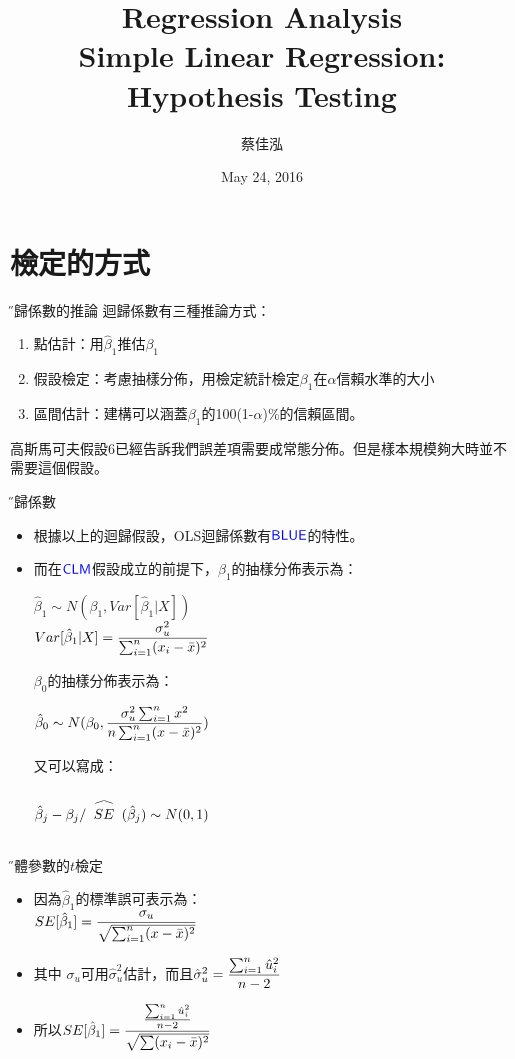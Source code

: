 \documentclass[xcolor=dvipsnames]{beamer}
\author[蔡佳泓]{\K 蔡佳泓}
\title[Statistical Methods for Social Sciences]{Regression Analysis\\
\smallskip
{\small {Simple Linear Regression: Hypothesis Testing}}}
\date{May 24, 2016} %
\institute[ESC \& GIEAS]{\H 國立政治大學選舉研究中心與東亞研究所}
\newcommand\reallywidehat[1]{%
\begin{array}{c}
\stretchto{
  \scaleto{
    \scalerel*[\widthof{#1}]{\bigwedge}
    {\rule[-\textheight/2]{1ex}{\textheight}} %
  }{1.25\textheight} %
}{0.5ex}\\           %
#1\\                 %
\rule{-1ex}{0ex}
\end{array}
}
\begin{document}
\maketitle
\tableofcontents
\section{檢定的方式}
\begin{frame}{\H 迴歸係數的推論}
迴歸係數有三種推論方式：
\begin{enumerate}
\item 點估計：用$ \hat{\beta}_{1} $推估$ \beta_{1} $
\item 假設檢定：考慮抽樣分佈，用檢定統計檢定$ \beta_{1} $在$\alpha$信賴水準的大小
\item 區間估計：建構可以涵蓋$ \beta_{1} $的100(1-$\alpha$)\%的信賴區間。
\end{enumerate}
高斯馬可夫假設6已經告訴我們誤差項需要成常態分佈。但是樣本規模夠大時並不需要這個假設。
\end{frame}
\begin{frame}{\H 迴歸係數}
\begin{itemize}
\item 根據以上的迴歸假設，OLS迴歸係數有$\textcolor{blue}{\mathsf{BLUE}}$的特性。
\item 而在$\textcolor{blue}{\mathsf{CLM}}$假設成立的前提下，$ \beta_{1} $的抽樣分佈表示為：
\begin{center}
$ \hat{\beta}_{1} \sim N(\beta_{1},Var[\hat{\beta}_{1}|X])$\\
$\mathlarger{Var[\hat{\beta}_{1}|X]=\frac{\sigma_{u}^{2}}{\sum_{i=1}^{n}(x_{i}-\bar{x})^2} } $
\end{center}
$\beta_{0}$的抽樣分佈表示為：
\begin{center}
$\hat{\beta}_{0} \sim N(\beta_{0}, \mathlarger{\frac{\sigma_{u}^2\sum_{i=1}^{n}x^2}{n\sum_{i=1}^{n}(x-\bar{x})^2}} ) $
\end{center}
又可以寫成：
\begin{center}
$\hat{\beta}_{j}-\beta_{j}/\reallywidehat{SE}(\hat{\beta}_{j})\sim N(0,1)$
\end{center}
\end{itemize}
\end{frame}
\begin{frame}{\H 母體參數的$t$檢定}
\begin{itemize}
\item 因為$\hat{\beta}_{1}$的標準誤可表示為：\\
$SE[\hat{\beta}_{1}]=\mathlarger{\frac{\sigma_{u}}{\sqrt{\sum_{i=1}^{n}(x-\bar{x})^2}}}$\\
\item 其中 $\sigma_{u}$可用$\hat{\sigma}_{u}^2$估計，而且$\hat{\sigma}_{u}^2=\mathlarger{\frac{\sum_{i=1}^{n}\hat{u}_{i}^{2}}{n-2}}$
\item 所以$SE[\hat{\beta}_{1}]=\mathlarger{\frac{\frac{\sum_{i=1}^{n}\hat{u}_{i}^{2}}{n-2}}{\sqrt{\sum(x_{i}-\bar{x})^2}}}  $
\end{itemize}
\end{frame}
\end{document}
